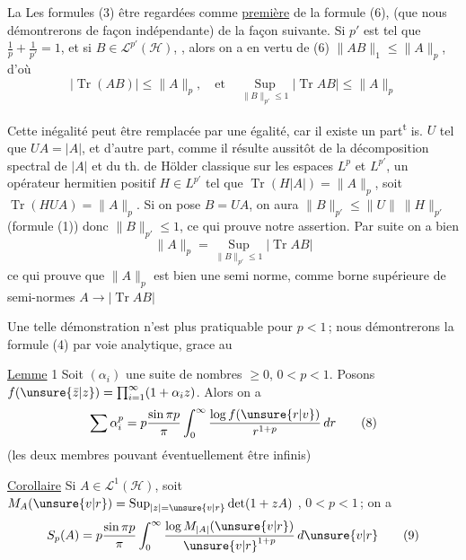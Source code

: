 La 
Les formules (3)   être regardées  comme
\uline{première} 
 de la formule (6), (que nous démontrerons de façon indépendante) de la façon
suivante. Si $p'$ est tel que $\frac{1}{p}+\frac{1}{p'}=1$,
et si $B\in\mathcal L^{p'}(\mathcal H)$, 
, alors
on a en vertu de (6) $\|AB\|_1\leq\|A\|_p$, d'où
\[
|\operatorname{Tr}(AB)|\leq\|A\|_p,\quad\text{et}\quad
\operatorname*{Sup}_{\|B\|_{p'}\leq1}|\operatorname{Tr}AB|\leq\|A\|_p
\]

Cette inégalité peut être remplacée par une égalité,
car il existe un  part\textsuperscript{t} is. $U$ tel que
$UA=|A|$,  et d'autre part, comme il
résulte aussitôt de la décomposition spectral de
$|A|$ et du th. de Hölder classique sur les
espaces $L^p$ et $L^{p'}$, un opérateur hermitien
positif $H\in L^{p'}$ tel que $\operatorname{Tr}(H|A|)=\|A\|_p$,
soit \deleted{\unsure{$|$}}$\operatorname{Tr}(HUA)$\deleted{\unsure{$|$}}$=\|A\|_p$. Si on pose
$B=UA$, on aura $\|B\|_{p'}\leq\|U\|\ \|H\|_{p'}$ (formule
(1)) donc $\|B\|_{p'}\leq1$, ce qui prouve notre assertion.
Par suite on a bien
\[
\|A\|_p=\operatorname*{Sup}_{\|B\|_{p'}\leq1}|\operatorname{Tr}AB|\tag*{(7)}
\]
ce qui prouve que $\|A\|_p$ est bien une
semi norme, comme borne supérieure de
semi-normes $A\to|\operatorname{Tr}AB|$

Une telle démonstration n'est plus pratiquable
pour $p<1$\,;  nous démontrerons la formule (4)
par voie analytique, grace au

\uline{Lemme} 1 \quad Soit $(\alpha_i)$ une suite   de
\margin{\rule[-3.9cm]{0.4pt}{4.1cm}}nombres $\geq0$, 
  $0<p<1$. Posons $f(\unsure{\bar z|z})=\prod_{i=1}^{\infty}(1+\alpha_i z)$.
Alors on a
\[
\sum\alpha_i^p=p\frac{\sin\pi p}{\pi}\int_0^\infty\frac{\log f(\unsure{r|v})}{r^{1+p}}\,dr\tag*{(8)}
\]
(les deux membres pouvant éventuellement
être infinis)

\uline{Corollaire}\quad\margin{\rule[-3.8cm]{0.4pt}{3.8cm}} Si $A\in\mathcal L^1(\mathcal H)$, soit
$M_A(\unsure{v|r})=\operatorname*{Sup}_{|z|=\unsure{v|r}}\det(1+zA)$
, 
  $0<p<1$\,; on a
\[
S_p(A)=p\frac{\sin\pi p}{\pi}\int_0^\infty\frac{\log M_{|A|}(\unsure{v|r})}{{\unsure{v|r}}^{1+p}}\,d\unsure{v|r}\tag*{(9)}
\]

